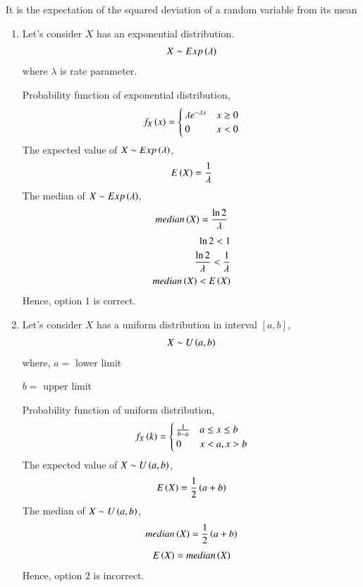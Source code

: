 \documentclass[journal,12pt,twocolumn]{IEEEtran}
\begin{document}
It is the expectation of the squared deviation of a random variable from its mean
\begin{enumerate}
    \item Let's consider $X$ has an exponential distribution.
    \begin{align}
        X \sim Exp\left(\lambda\right)
    \end{align}
    where $\lambda$ is rate parameter.
    
    Probability function of exponential distribution,
    \begin{align}
        f_X\left(x\right)=
        \begin{cases}
            \lambda e^{-\lambda x} & x\geq0\\
            0 & x<0
        \end{cases}
    \end{align}
    The expected value of $X \sim Exp\left(\lambda\right)$,
    \begin{align}
        E\left(X\right)=\frac{1}{\lambda}
    \end{align}
    The median of $X \sim Exp\left(\lambda\right)$,
    \begin{align}
        median\left(X\right)=\frac{\ln{2}}{\lambda}
    \end{align}
    \begin{align}
        \ln{2}<1\\
        \frac{\ln{2}}{\lambda}<\frac{1}{\lambda}\\
         median\left(X\right)<E\left(X\right)
    \end{align}
    Hence, option $1$ is correct.
    
    \item Let's consider $X$ has a uniform distribution in interval $[a,b]$,
    \begin{align}
        X \sim U\left(a,b\right)
    \end{align}
    where,
    $a=$ lower limit
    
    $b=$ upper limit
    
    Probability function of uniform distribution,
    \begin{align}
        f_X\left(k\right)=
        \begin{cases}
            \frac{1}{b-a} & a\leq x\leq b\\
            0 & x < a, x > b
        \end{cases}
    \end{align}
    The expected value of $X \sim U\left(a,b\right)$,
    \begin{align}
        E\left(X\right)=\frac{1}{2}\left(a+b\right)
    \end{align}
    The median of $X \sim U\left(a,b\right)$,
    \begin{align}
        median\left(X\right)=\frac{1}{2}\left(a+b\right)
    \end{align}
    \begin{align}
        E\left(X\right)=median\left(X\right)
    \end{align}
    Hence, option $2$ is incorrect.
    

\end{enumerate}
\end{document}
